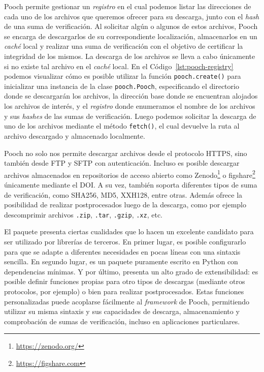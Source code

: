Pooch permite gestionar un \emph{registro} en el cual podemos listar las
direcciones de cada uno de los archivos que queremos ofrecer para su descarga,
junto con el \emph{hash} de una suma de verificación. Al solicitar algún
o algunos de estos archivos, Pooch se encarga de descargarlos de su
correspondiente localización, almacenarlos en un \emph{caché} local y realizar
una suma de verificación con el objetivo de certificar la integridad de los
mismos.
La descarga de los archivos se lleva a cabo únicamente si no existe tal archivo
en el \emph{caché} local.
En el Código~\ref{lst:pooch-registry} podemos visualizar cómo es posible
utilizar la función \texttt{pooch.create()} para inicializar una instancia de
la clase \texttt{pooch.Pooch}, especificando el directorio donde se descargarán
los archivos, la dirección base donde se encuentran alojados los archivos de
interés, y el \emph{registro} donde enumeramos el nombre de los archivos y sus
\emph{hashes} de las sumas de verificación.
Luego podemos solicitar la descarga de uno de los archivos mediante el método
\texttt{fetch()}, el cual devuelve la ruta al archivo descargado y almacenado
localmente.

Pooch no solo nos permite descargar archivos desde el protocolo HTTPS,
sino también desde FTP y SFTP con autenticación.
Incluso es posible descargar archivos almacenados en repositorios de acceso
abierto como Zenodo\footnote{\url{https://zenodo.org/}}
o figshare\footnote{\url{https://figshare.com}} únicamente mediante el
\ac{DOI}.
A su vez, también soporta diferentes tipos de suma de verificación, como
SHA256, MD5, XXH128, entre otras.
Además ofrece la posibilidad de realizar postprocesados luego de la descarga,
como por ejemplo descomprimir archivos \texttt{.zip}, \texttt{.tar},
\texttt{.gzip}, \texttt{.xz}, etc.

El paquete presenta ciertas cualidades que lo hacen un excelente candidato para
ser utilizado por librerías de terceros.
En primer lugar, es posible configurarlo para que se adapte a diferentes
necesidades en pocas líneas con una sintaxis sencilla.
En segundo lugar, es un paquete puramente escrito en Python con dependencias
mínimas.
Y por último, presenta un alto grado de extensibilidad: es posible definir
funciones propias para otro tipos de descargas (mediante otros protocolos, por
ejemplo) o bien para realizar postprocesados. Estas funciones personalizadas
puede acoplarse fácilmente al \emph{framework} de Pooch, permitiendo
utilizar su misma sintaxis y sus capacidades de descarga, almacenamiento
y comprobación de sumas de verificación, incluso en aplicaciones particulares.

